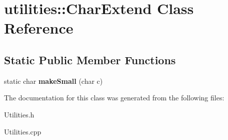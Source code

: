\hypertarget{classutilities_1_1CharExtend}{\section{utilities\-:\-:\-Char\-Extend \-Class \-Reference}
\label{classutilities_1_1CharExtend}
}
\subsection*{\-Static \-Public \-Member \-Functions}
\begin{DoxyCompactItemize}
\item 
\hypertarget{classutilities_1_1CharExtend_acd0755f094e805bd77389b4efd0f7ef4}{static char {\bfseries make\-Small} (char c)}\label{classutilities_1_1CharExtend_acd0755f094e805bd77389b4efd0f7ef4}

\end{DoxyCompactItemize}


\-The documentation for this class was generated from the following files\-:\begin{DoxyCompactItemize}
\item 
\-Utilities.\-h\item 
\-Utilities.\-cpp\end{DoxyCompactItemize}

